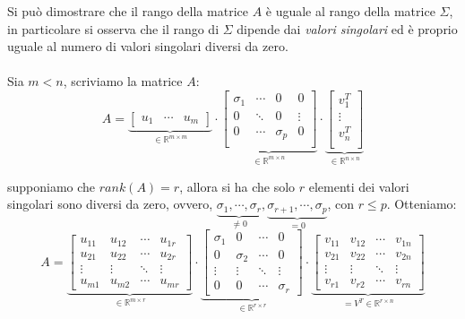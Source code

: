 Si può dimostrare che il rango della matrice $A$ è uguale al rango della matrice $	\Sigma$, in particolare si osserva che il rango di $\Sigma$ dipende dai \emph{valori singolari} ed è proprio uguale al numero di valori singolari diversi da zero. 
\paragraph{}
Sia $m<n$, scriviamo la matrice $A$:
\begin{equation}
	A = 
	\underbrace{
	\begin{bmatrix}
		u_1 & \cdots & u_m
	\end{bmatrix}
	}_{\in\mathbb{R}^{m\times m}}
	\cdot
	\underbrace{
	\begin{bmatrix}
		\sigma_1 & \cdots & 0 & 0 \\
		0 & \ddots & 0 & \vdots \\
		0 & \cdots & \sigma_p & 0 \\ 
	\end{bmatrix}
	}_{\in\mathbb{R}^{m\times n}}
	\cdot
	\underbrace{
	\begin{bmatrix}
		v_1^T \\
		\vdots \\
		v_n^T \\
	\end{bmatrix}
	}_{\in \mathbb{R}^{n \times n}}
\end{equation}

supponiamo che $rank(A) = r$, allora si ha che solo $r$ elementi dei valori singolari sono diversi da zero, ovvero, $\underbrace{\sigma_1, \cdots, \sigma_r}_{\neq 0}, \underbrace{\sigma_{r+1}, \cdots, \sigma_p}_{= 0}$, con $r\leqslant p$.
Otteniamo:
\begin{equation}
	A = 
	\underbrace{
	\begin{bmatrix}
		u_{11} & u_{12} & \cdots & u_{1r} \\
		u_{21} & u_{22} & \cdots & u_{2r} \\ 
		\vdots & \vdots & \ddots & \vdots \\
		u_{m1} & u_{m2} & \cdots & u_{mr} 
	\end{bmatrix}
	}_{\in\mathbb{R}^{m \times r}}
	\cdot
	\underbrace{
	\begin{bmatrix}
		\sigma_{1} & 0 & \cdots & 0 \\
		0 & \sigma_{2} & \cdots & 0 \\ 
		\vdots & \vdots & \ddots & \vdots \\
		0 & 0 & \cdots & \sigma_{r} 
	\end{bmatrix}
	}_{\in\mathbb{R}^{r \times r}}
	\cdot
	\underbrace{
	\begin{bmatrix}
		v_{11} & v_{12} & \cdots & v_{1n} \\
		v_{21} & v_{22} & \cdots & v_{2n} \\ 
		\vdots & \vdots & \ddots & \vdots \\
		v_{r1} & v_{r2} & \cdots & v_{rn} 
	\end{bmatrix}
	}_{= V^{T}\in\mathbb{R}^{r \times n}}
\end{equation}

